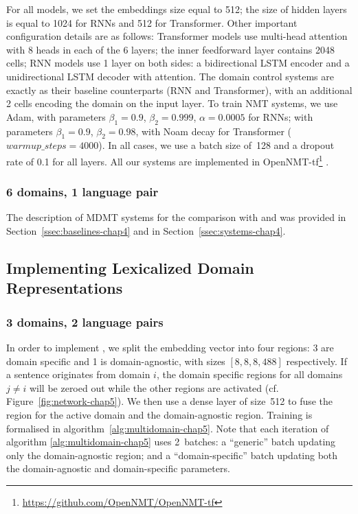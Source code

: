 For all models, we set the embeddings size equal to 512; the size of hidden layers is equal to 1024 for RNNs and 512 for Transformer. 
Other important configuration details are as follows:
Transformer models use multi-head attention with 8 heads in each of the 6 layers; 
the inner feedforward layer contains 2048 cells;  
RNN models use 1 layer on both sides: 
a bidirectional LSTM encoder and a unidirectional LSTM decoder with attention.
The domain control systems are exactly as their baseline counterparts (RNN and Transformer), with an additional 2 cells encoding the domain on the input layer.
To train NMT systems, we use Adam, with parameters $\beta_1=0.9$, $\beta_2 = 0.999$, $\alpha=0.0005$ for RNNs; with parameters $\beta_1=0.9$, $\beta_2= 0.98$, with Noam decay \citep{Vaswani17attention} for Transformer ($warmup\_steps=4000$). In all cases, we use a batch size of~128 and a dropout rate of 0.1 for all layers. 
All our systems are implemented in OpenNMT-tf\footnote{\url{https://github.com/OpenNMT/OpenNMT-tf}} \citep{Klein17opennmt}.
\subsubsection{6 domains, 1 language pair}
The description of MDMT systems for the comparison with  and  was provided in Section~\ref{ssec:baselines-chap4} and in Section~\ref{ssec:systems-chap4}.

\subsection{Implementing Lexicalized Domain Representations}
\subsubsection{3 domains, 2 language pairs}
\label{sssec:ldr3domain-chap5}
In order to implement , we split the embedding vector into four regions: 3 are domain specific and 1 is domain-agnostic, with sizes $[8,8,8,488]$ respectively. If a sentence originates from domain $i$, the domain specific regions for all domains $j \neq i$ will be zeroed out while the other regions are activated (cf. Figure~\ref{fig:network-chap5}). 
We then use a dense layer of size~512 to fuse the region for the active domain and the domain-agnostic region. Training is formalised in algorithm~\ref{alg:multidomain-chap5}.
%
Note that each iteration of algorithm \ref{alg:multidomain-chap5} uses 2~batches: a ``generic'' batch updating only the domain-agnostic region; and a ``domain-specific'' batch updating both the domain-agnostic and domain-specific parameters. 

